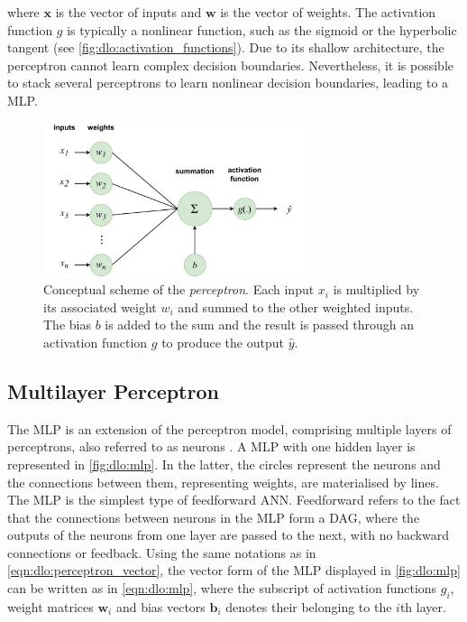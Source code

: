\noindent where $\mathbf{x}$ is the vector of inputs and $\mathbf{w}$ is the
vector of weights. The activation function $g$ is typically a nonlinear
function, such as the sigmoid or the hyperbolic tangent (see
\cref{fig:dlo:activation_functions}). Due to its shallow architecture, the
perceptron cannot learn complex decision boundaries. Nevertheless, it is
possible to stack several perceptrons to learn nonlinear decision boundaries,
leading to a \acl{MLP}.\\

\begin{figure}[htbp]
  \centering
  \includegraphics[width=0.7\textwidth]{chapter_dlo/assets/perceptron_scheme.pdf}
  \caption{Conceptual scheme of the \emph{perceptron}. Each input $x_i$ is multiplied
  by its associated weight $w_i$ and summed to the other weighted inputs. The
  bias $b$ is added to the sum and the result is passed through an activation
  function $g$ to produce the output $\hat{y}$.}
  \label{fig:dlo:perceptron}
\end{figure}

\subsection{Multilayer Perceptron}\label{sec:dlo:mlp}

The \acf{MLP} is an extension of the perceptron model, comprising multiple
layers of perceptrons, also referred to as neurons \cite{rumelhart1986learning}.
A \ac{MLP} with one hidden layer is represented in \cref{fig:dlo:mlp}. In the
latter, the circles represent the neurons and the connections between them,
representing weights, are materialised by lines. The \ac{MLP} is the simplest
type of feedforward \ac{ANN}. Feedforward refers to the fact that the
connections between neurons in the \ac{MLP} form a \acf{DAG}, where the outputs
of the neurons from one layer are passed to the next, with no backward
connections or feedback. Using the same notations as in
\cref{eqn:dlo:perceptron_vector}, the vector form of the \ac{MLP} displayed in
\cref{fig:dlo:mlp} can be written as in \cref{eqn:dlo:mlp}, where the subscript
of activation functions $g_i$, weight matrices $\mathbf{w}_i$ and bias vectors
$\mathbf{b}_i$ denotes their belonging to the $i$th layer.\\

